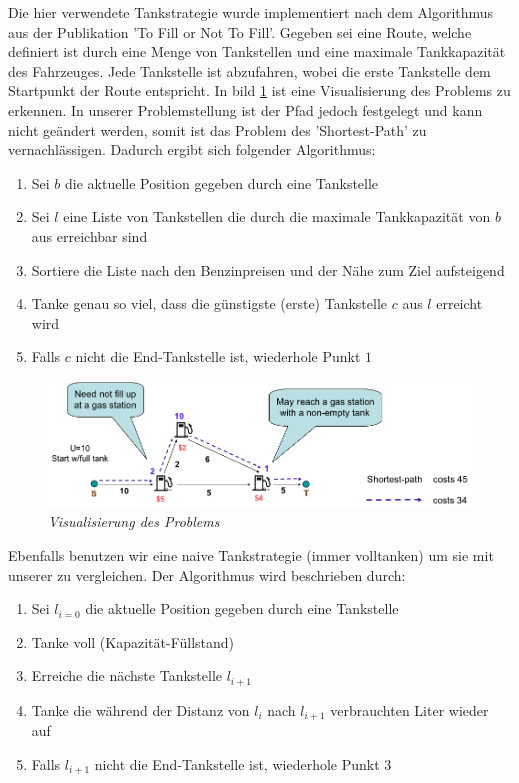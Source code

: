 \documentclass[
ngerman          %
,a4paper          %
,11pt
,pdftex
]{report}
\begin{document}
Die hier verwendete Tankstrategie wurde implementiert nach dem Algorithmus aus der Publikation 'To Fill or Not To Fill'\cite{fixedgas}.
Gegeben sei eine Route, welche definiert ist durch eine Menge von Tankstellen und eine maximale Tankkapazität des Fahrzeuges.
Jede Tankstelle ist abzufahren, wobei die erste Tankstelle dem Startpunkt der Route entspricht. In bild \ref{fig:fixedgas} ist eine Visualisierung des Problems zu erkennen. In unserer Problemstellung ist der Pfad jedoch festgelegt und kann nicht geändert werden, somit ist das Problem des 'Shortest-Path' zu vernachlässigen. 
Dadurch ergibt sich folgender Algorithmus:
\begin{enumerate}
\item Sei $b$ die aktuelle Position gegeben durch eine Tankstelle
\item Sei $l$ eine Liste von Tankstellen die durch die maximale Tankkapazität von $b$ aus erreichbar sind
\item Sortiere die Liste nach den Benzinpreisen und der Nähe zum Ziel aufsteigend
\item Tanke genau so viel, dass die günstigste (erste) Tankstelle $c$ aus $l$ erreicht wird
\item Falls $c$ nicht die End-Tankstelle ist, wiederhole Punkt $1$
\end{enumerate}

\begin{figure}
	\centering
	\includegraphics[width=0.8\linewidth]{images/fixedgas}
	\caption[Beispiel Ablauf]{\textit{Visualisierung des Problems \cite{fixedgasimage}}} 
	\label{fig:fixedgas}
\end{figure}



Ebenfalls benutzen wir eine naive Tankstrategie (immer volltanken) um sie mit unserer zu vergleichen. Der Algorithmus wird beschrieben durch:

\begin{enumerate}
\item Sei $l_{i=0}$ die aktuelle Position gegeben durch eine Tankstelle
\item Tanke voll (Kapazität-Füllstand)
\item Erreiche die nächste Tankstelle $l_{i+1}$
\item Tanke die während der Distanz von $l_{i}$ nach $l_{i+1}$ verbrauchten Liter wieder auf
\item Falls $l_{i+1}$ nicht die End-Tankstelle ist, wiederhole Punkt $3$
\end{enumerate}
\end{document}
